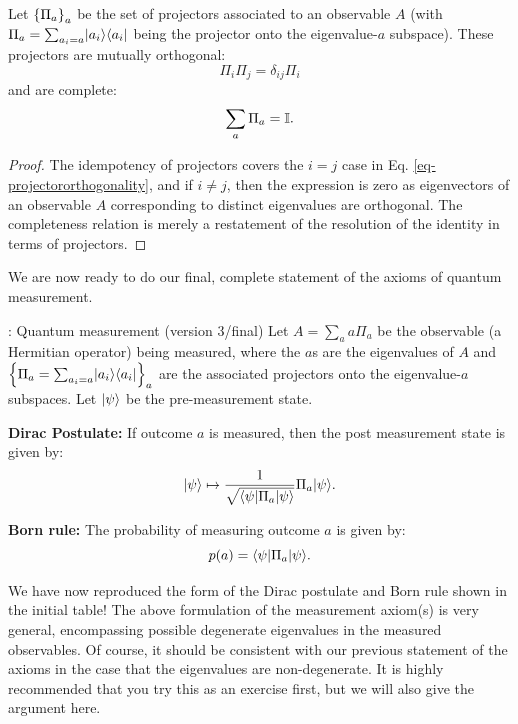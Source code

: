 \begin{thmbox}{}
    Let $\set{\Pi_a}_a$ be the set of projectors associated to an observable $A$ (with $\Pi_a = \sum_{a_i = a}\lvert a_i \rangle \langle a_i \rvert$ being the projector onto the eigenvalue-$a$ subspace). These projectors are mutually orthogonal:
    \begin{equation}\label{eq-projectororthogonality}
        \Pi_i\Pi_j = \delta_{ij}\Pi_i
    \end{equation}
    and are complete:
    \begin{equation}
        \sum_a \Pi_a = \mathbb{I}.
    \end{equation}
\end{thmbox}
\begin{proof}
    The idempotency of projectors covers the $i = j$ case in Eq. \eqref{eq-projectororthogonality}, and if $i \neq j$, then the expression is zero as eigenvectors of an observable $A$ corresponding to distinct eigenvalues are orthogonal. The completeness relation is merely a restatement of the resolution of the identity in terms of projectors.
\end{proof}

We are now ready to do our final, complete statement of the axioms of quantum measurement.

\begin{axiombox}{: Quantum measurement (version 3/final)}
    Let $A =  \sum_a a\Pi_a$ be the observable (a Hermitian operator) being measured,  where the $a$s are the eigenvalues of $A$ and $\set{\Pi_a = \sum_{a_i = a}\lvert a_i \rangle \langle a_i \rvert}_a$ are the associated projectors onto the eigenvalue-$a$ subspaces. Let $\lvert \psi \rangle$ be the pre-measurement state.

    \textbf{Dirac Postulate:} If outcome $a$ is measured, then the post measurement state is given by:
    \begin{equation}\label{eq-diracpostulate}
        \lvert \psi \rangle \mapsto \frac{1}{\sqrt{\langle \psi \rvert\Pi_a\lvert \psi \rangle}}\Pi_a\lvert \psi \rangle.
    \end{equation}

    \textbf{Born rule:} The probability of measuring outcome $a$ is given by:
    \begin{equation}\label{eq-bornrule}
        p(a) = \langle \psi \rvert\Pi_a\lvert \psi \rangle.
    \end{equation}
\end{axiombox}
We have now reproduced the form of the Dirac postulate and Born rule shown in the initial table! The above formulation of the measurement axiom(s) is very general, encompassing possible degenerate eigenvalues in the measured observables. Of course, it should be consistent with our previous statement of the axioms in the case that the eigenvalues are non-degenerate. It is highly recommended that you try this as an exercise first, but we will also give the argument here.

